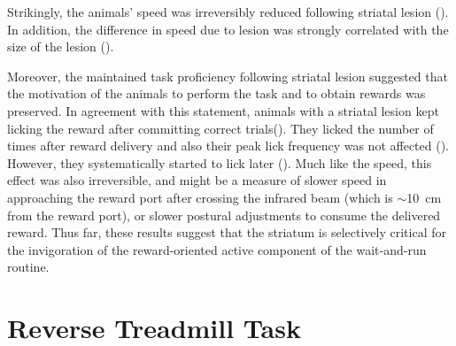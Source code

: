 Strikingly, the animals' speed was irreversibly reduced following striatal lesion ().
In addition, the difference in speed due to lesion was strongly correlated with the size of the lesion ().

Moreover, the maintained task proficiency following striatal lesion suggested that the motivation of the animals to perform the task and to obtain rewards was preserved.
In agreement with this statement, animals with a striatal lesion kept licking the reward after committing correct trials().
They licked the number of times after reward delivery and also their peak lick frequency was not affected ().
However, they systematically started to lick later ().
Much like the speed, this effect was also irreversible, and might be a measure of slower speed in approaching the reward port after crossing the infrared beam (which is $\sim$10~cm from the reward port), or slower postural adjustments to consume the delivered reward.
Thus far, these results suggest that the striatum is selectively critical for the invigoration of the reward-oriented active component of the wait-and-run routine.


\section{Reverse Treadmill Task}
\label{ch:lesion:rev}

